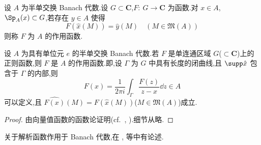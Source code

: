 \begin{definition}\label{def:3.1.47}
设 $A$ 为半单交换 Banach 代数.设 $G \subset \mathbf{C}$,$F:\ G \to \mathbf{C}$ 为函数.对 $x \in A$,$\Sp_{A}(x) \subset G$,若存在 $y \in A$ 使得
\begin{equation*}
F(\widehat{x}(M)) = \widehat{y}(M) \quad (M \in \mathfrak{M}(A))
\end{equation*}
则称 $F$ 为 $A$ 的作用函数.
\end{definition}

\begin{theorem}\label{thm:3.1.48}
设 $A$ 为具有单位元 $e$ 的半单交换 Banach 代数.若 $F$ 是单连通区域 $G$($\subset \mathbf{C}$)上的正则函数,则 $F$ 是 $A$ 的作用函数.即,设 $\Gamma$ 为 $G$ 中具有长度的闭曲线,且 $\supp \hat{x}$ 包含于 $\Gamma$ 的内部,则
\begin{equation*}
F(x) = \frac{1}{2\pi i}\int_{\Gamma}\frac{F(z)}{z - x}\dd z \in A
\end{equation*}
可以定义,且 $\widehat{F(x)}(M) = F(\widehat{x}(M))$($M \in \mathfrak{M}(A)$)成立.
\end{theorem}

\begin{proof}
由向量值函数的函数论证明(cf.\ \cite{ch3:3}, \cite{ch3:8}).细节从略.
\end{proof}

关于解析函数作用于 Banach 代数,在 \cite{ch3:1}, \cite{ch3:2} 等中有论述.
